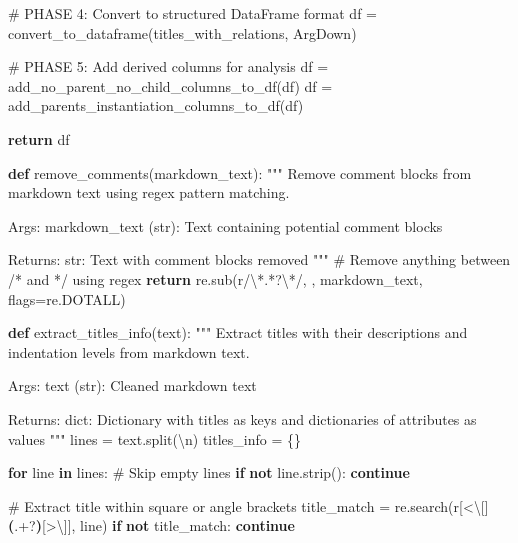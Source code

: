 \documentclass[
  11pt,
  letterpaper,
  openany]{book}
\newenvironment{Shaded}{\begin{snugshade}}{\end{snugshade}}
\newcommand{\CharTok}[1]{\textcolor[rgb]{0.13,0.47,0.30}{#1}}
\newcommand{\CommentTok}[1]{\textcolor[rgb]{0.37,0.37,0.37}{#1}}
\newcommand{\ControlFlowTok}[1]{\textcolor[rgb]{0.00,0.23,0.31}{\textbf{#1}}}
\newcommand{\DecValTok}[1]{\textcolor[rgb]{0.68,0.00,0.00}{#1}}
\newcommand{\KeywordTok}[1]{\textcolor[rgb]{0.00,0.23,0.31}{\textbf{#1}}}
\newcommand{\NormalTok}[1]{\textcolor[rgb]{0.00,0.23,0.31}{#1}}
\newcommand{\OperatorTok}[1]{\textcolor[rgb]{0.37,0.37,0.37}{#1}}
\newcommand{\PreprocessorTok}[1]{\textcolor[rgb]{0.68,0.00,0.00}{#1}}
\newcommand{\StringTok}[1]{\textcolor[rgb]{0.13,0.47,0.30}{#1}}
\newcommand{\VerbatimStringTok}[1]{\textcolor[rgb]{0.13,0.47,0.30}{#1}}
\begin{document}
\begin{landscape}
\begin{Shaded}
\begin{Highlighting}[]
    \CommentTok{\# PHASE 4: Convert to structured DataFrame format}
\NormalTok{    df }\OperatorTok{=}\NormalTok{ convert\_to\_dataframe(titles\_with\_relations, ArgDown)}

    \CommentTok{\# PHASE 5: Add derived columns for analysis}
\NormalTok{    df }\OperatorTok{=}\NormalTok{ add\_no\_parent\_no\_child\_columns\_to\_df(df)}
\NormalTok{    df }\OperatorTok{=}\NormalTok{ add\_parents\_instantiation\_columns\_to\_df(df)}

    \ControlFlowTok{return}\NormalTok{ df}

\KeywordTok{def}\NormalTok{ remove\_comments(markdown\_text):}
    \CommentTok{"""}
\CommentTok{    Remove comment blocks from markdown text using regex pattern matching.}

\CommentTok{    Args:}
\CommentTok{        markdown\_text (str): Text containing potential comment blocks}

\CommentTok{    Returns:}
\CommentTok{        str: Text with comment blocks removed}
\CommentTok{    """}
    \CommentTok{\# Remove anything between /* and */ using regex}
    \ControlFlowTok{return}\NormalTok{ re.sub(}\VerbatimStringTok{r\textquotesingle{}/}\CharTok{\textbackslash{}*}\DecValTok{.}\OperatorTok{*?}\CharTok{\textbackslash{}*}\VerbatimStringTok{/\textquotesingle{}}\NormalTok{, }\StringTok{\textquotesingle{}\textquotesingle{}}\NormalTok{, markdown\_text, flags}\OperatorTok{=}\NormalTok{re.DOTALL)}

\KeywordTok{def}\NormalTok{ extract\_titles\_info(text):}
    \CommentTok{"""}
\CommentTok{    Extract titles with their descriptions and indentation levels from markdown text.}

\CommentTok{    Args:}
\CommentTok{        text (str): Cleaned markdown text}

\CommentTok{    Returns:}
\CommentTok{        dict: Dictionary with titles as keys and dictionaries of attributes as values}
\CommentTok{    """}
\NormalTok{    lines }\OperatorTok{=}\NormalTok{ text.split(}\StringTok{\textquotesingle{}}\CharTok{\textbackslash{}n}\StringTok{\textquotesingle{}}\NormalTok{)}
\NormalTok{    titles\_info }\OperatorTok{=}\NormalTok{ \{\}}

    \ControlFlowTok{for}\NormalTok{ line }\KeywordTok{in}\NormalTok{ lines:}
        \CommentTok{\# Skip empty lines}
        \ControlFlowTok{if} \KeywordTok{not}\NormalTok{ line.strip():}
            \ControlFlowTok{continue}

        \CommentTok{\# Extract title within square or angle brackets}
\NormalTok{        title\_match }\OperatorTok{=}\NormalTok{ re.search(}\VerbatimStringTok{r\textquotesingle{}}\PreprocessorTok{[\textless{}}\CharTok{\textbackslash{}[}\PreprocessorTok{]}\KeywordTok{(}\DecValTok{.}\OperatorTok{+?}\KeywordTok{)}\PreprocessorTok{[\textgreater{}}\CharTok{\textbackslash{}]}\PreprocessorTok{]}\VerbatimStringTok{\textquotesingle{}}\NormalTok{, line)}
        \ControlFlowTok{if} \KeywordTok{not}\NormalTok{ title\_match:}
            \ControlFlowTok{continue}


\end{Highlighting}
\end{Shaded}
\end{landscape}
\end{document}
